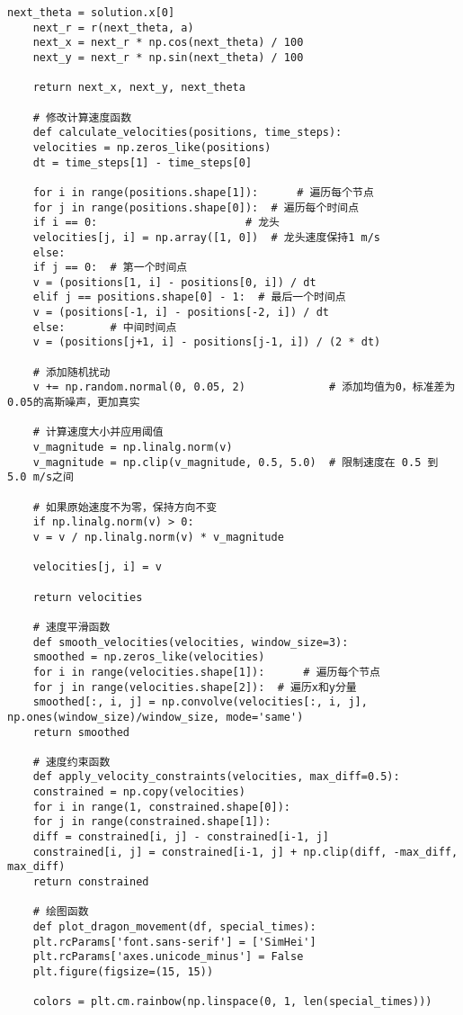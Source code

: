 \begin{lstlisting}[caption={问题一处理代码1}]
	next_theta = solution.x[0]
	next_r = r(next_theta, a)
	next_x = next_r * np.cos(next_theta) / 100
	next_y = next_r * np.sin(next_theta) / 100
	
	return next_x, next_y, next_theta
	
	# 修改计算速度函数
	def calculate_velocities(positions, time_steps):
	velocities = np.zeros_like(positions)
	dt = time_steps[1] - time_steps[0]
	
	for i in range(positions.shape[1]):      # 遍历每个节点
	for j in range(positions.shape[0]):  # 遍历每个时间点
	if i == 0:                       # 龙头
	velocities[j, i] = np.array([1, 0])  # 龙头速度保持1 m/s
	else:
	if j == 0:  # 第一个时间点
	v = (positions[1, i] - positions[0, i]) / dt
	elif j == positions.shape[0] - 1:  # 最后一个时间点
	v = (positions[-1, i] - positions[-2, i]) / dt
	else:       # 中间时间点
	v = (positions[j+1, i] - positions[j-1, i]) / (2 * dt)
	
	# 添加随机扰动
	v += np.random.normal(0, 0.05, 2)             # 添加均值为0，标准差为0.05的高斯噪声，更加真实
	
	# 计算速度大小并应用阈值
	v_magnitude = np.linalg.norm(v)
	v_magnitude = np.clip(v_magnitude, 0.5, 5.0)  # 限制速度在 0.5 到 5.0 m/s之间
	
	# 如果原始速度不为零，保持方向不变
	if np.linalg.norm(v) > 0:
	v = v / np.linalg.norm(v) * v_magnitude
	
	velocities[j, i] = v
	
	return velocities
	
	# 速度平滑函数
	def smooth_velocities(velocities, window_size=3):
	smoothed = np.zeros_like(velocities)
	for i in range(velocities.shape[1]):      # 遍历每个节点
	for j in range(velocities.shape[2]):  # 遍历x和y分量
	smoothed[:, i, j] = np.convolve(velocities[:, i, j], np.ones(window_size)/window_size, mode='same')
	return smoothed
	
	# 速度约束函数
	def apply_velocity_constraints(velocities, max_diff=0.5):
	constrained = np.copy(velocities)
	for i in range(1, constrained.shape[0]):
	for j in range(constrained.shape[1]):
	diff = constrained[i, j] - constrained[i-1, j]
	constrained[i, j] = constrained[i-1, j] + np.clip(diff, -max_diff, max_diff)
	return constrained
	
	# 绘图函数
	def plot_dragon_movement(df, special_times):
	plt.rcParams['font.sans-serif'] = ['SimHei']
	plt.rcParams['axes.unicode_minus'] = False
	plt.figure(figsize=(15, 15))
	
	colors = plt.cm.rainbow(np.linspace(0, 1, len(special_times)))
	

\end{lstlisting}
